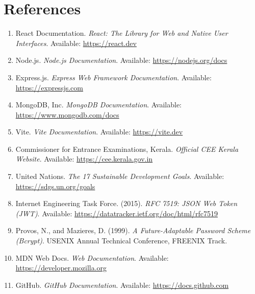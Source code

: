 \documentclass[12pt,a4paper,oneside]{report}
\begin{document}
\chapter{References}
\begin{enumerate}
    \item React Documentation. \textit{React: The Library for Web and Native User Interfaces}. Available: \url{https://react.dev}
    \item Node.js. \textit{Node.js Documentation}. Available: \url{https://nodejs.org/docs}
    \item Express.js. \textit{Express Web Framework Documentation}. Available: \url{https://expressjs.com}
    \item MongoDB, Inc. \textit{MongoDB Documentation}. Available: \url{https://www.mongodb.com/docs}
    \item Vite. \textit{Vite Documentation}. Available: \url{https://vite.dev}
    \item Commissioner for Entrance Examinations, Kerala. \textit{Official CEE Kerala Website}. Available: \url{https://cee.kerala.gov.in}
    \item United Nations. \textit{The 17 Sustainable Development Goals}. Available: \url{https://sdgs.un.org/goals}
    \item Internet Engineering Task Force. (2015). \textit{RFC 7519: JSON Web Token (JWT)}. Available: \url{https://datatracker.ietf.org/doc/html/rfc7519}
    \item Provos, N., and Mazieres, D. (1999). \textit{A Future-Adaptable Password Scheme (Bcrypt)}. USENIX Annual Technical Conference, FREENIX Track.
    \item MDN Web Docs. \textit{Web Documentation}. Available: \url{https://developer.mozilla.org}
    \item GitHub. \textit{GitHub Documentation}. Available: \url{https://docs.github.com}
\end{enumerate}
\end{document}
